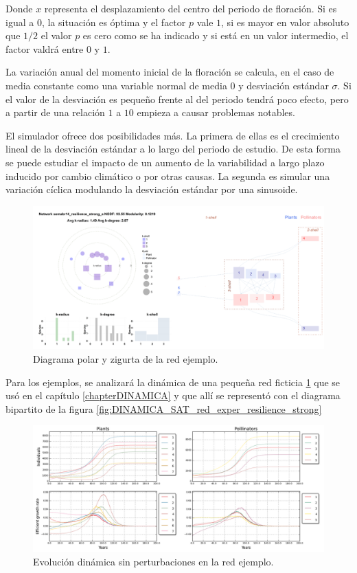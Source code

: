 Donde $x$ representa el desplazamiento del centro del periodo de floración. Si es igual a $0$, la situación es óptima y el factor $p$ vale $1$, si es mayor en valor absoluto que $1/2$ el valor $p$ es cero como se ha indicado y si está en un valor intermedio, el factor valdrá entre $0$ y $1$.

La variación anual del momento inicial de la floración se calcula, en el caso de media constante como una variable normal de media $0$ y desviación estándar $\sigma$. Si el valor de la desviación es pequeño frente al del periodo tendrá poco efecto, pero a partir de una relación $1$ a $10$ empieza a causar problemas notables.

El simulador ofrece dos posibilidades más. La primera de ellas es el crecimiento lineal de la desviación estándar a lo largo del periodo de estudio. De esta forma se puede estudiar el impacto de un aumento de la variabilidad a largo plazo inducido por cambio climático o por otras causas. La segunda es simular una variación cíclica modulando la desviación estándar por una sinusoide.

\begin{figure}[h!]
\centering
\includegraphics[scale=1]{ManFigs/sigmund_oscilacion_diag_red.png}
\caption{Diagrama polar y zigurta de la red ejemplo.}
\label{fig:ASIGMUNDMAN_sigmund_oscilacion_diag_red}
\end{figure}

Para los ejemplos, se analizará la dinámica de una pequeña red ficticia \ref{fig:ASIGMUNDMAN_sigmund_oscilacion_diag_red} que se usó en el capítulo \ref{chapterDINAMICA} y que allí se representó con el diagrama bipartito de la figura \ref{fig:DINAMICA_SAT_red_exper_resilience_strong}

\begin{figure}[h!]
\centering
\includegraphics[scale=1]{ManFigs/sigmund_red_exper.png}
\caption{Evolución dinámica sin perturbaciones en la red ejemplo.}
\label{fig:ASIGMUNDMAN_sigmund_red_exper}
\end{figure}

